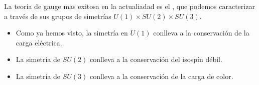 La teoría de gauge mas exitosa en la actualiadad es el , que podemos caracterizar a través de sus grupos de simetrías $U(1)\times SU(2)\times SU(3)$.

\begin{itemize}
	\item Como ya hemos visto, la simetría en $U(1)$ conlleva a la conservación de la carga eléctrica.
	\item La simetría de $SU(2)$ conlleva a la conservación del isospín débil.
	\item La simetría de $SU(3)$ conlleva a la conservación de la carga de color.
\end{itemize}
